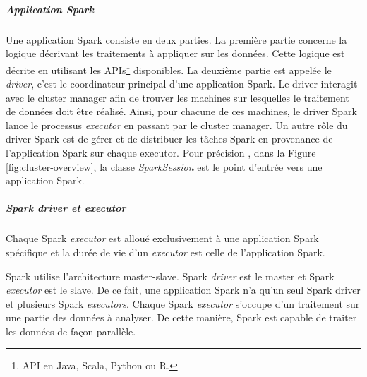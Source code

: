 \subparagraph{Application Spark} \label{sparkpresentationsection}
Une application Spark consiste en deux parties. La première partie concerne la logique décrivant les traitements à appliquer sur les données.  Cette logique est décrite en utilisant les APIs\footnote{API en Java, Scala, Python ou R.} disponibles. La deuxième partie est appelée le \textit{driver}, c'est le coordinateur principal d'une application Spark. Le driver interagit avec le cluster manager afin de trouver les machines sur lesquelles le traitement de données doit être réalisé. Ainsi, pour chacune de ces machines, le driver Spark lance le processus \textit{executor} en passant par le cluster manager. Un autre rôle du  driver Spark est de gérer et de distribuer les tâches Spark en provenance de l'application Spark sur chaque executor. Pour précision , dans la Figure \ref{fig:cluster-overview}, la classe \textit{SparkSession} est le point d'entrée vers une application Spark.

\subparagraph{Spark driver et executor}

Chaque Spark \textit{executor} est alloué exclusivement à une application Spark spécifique et la durée de vie d'un \textit{executor} est celle de l'application Spark. 

Spark utilise l'architecture master-slave. Spark \textit{driver} est le master et Spark \textit{executor} est le slave. De ce fait, une application Spark n'a qu'un seul Spark driver et plusieurs Spark \textit{executors}. Chaque Spark \textit{executor} s'occupe d'un traitement  sur une partie  des données à analyser. De cette manière,  Spark est capable de traiter  les données de façon parallèle. 


